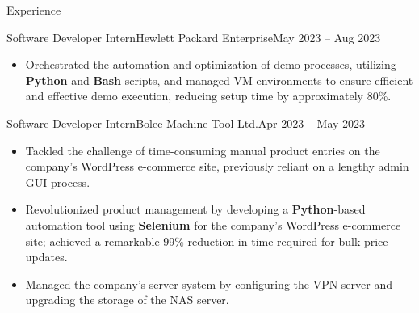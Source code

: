 \begin{cvsection}{Experience}
\begin{cvsubsection}{Software Developer Intern}{Hewlett Packard Enterprise}{May 2023 -- Aug 2023}
\begin{itemize}
      \item Orchestrated the automation and optimization of demo processes, utilizing \textbf{Python} and \textbf{Bash} scripts, and managed VM environments to ensure efficient and effective demo execution, reducing setup time by approximately 80\%.
    \end{itemize}
  \end{cvsubsection}
  \begin{cvsubsection}{Software Developer Intern}{Bolee Machine Tool Ltd.}{Apr 2023 -- May 2023}	
    \begin{itemize}
      \item Tackled the challenge of time-consuming manual product entries on the company's WordPress e-commerce site, previously reliant on a lengthy admin GUI process.
      \item Revolutionized product management by developing a \textbf{Python}-based automation tool using \textbf{Selenium} for the company's WordPress e-commerce site; achieved a remarkable 99\% reduction in time required for bulk price updates.
      \item Managed the company’s server system by configuring the VPN server and upgrading the storage of the NAS server.
    \end{itemize}
  \end{cvsubsection}
\end{cvsection}